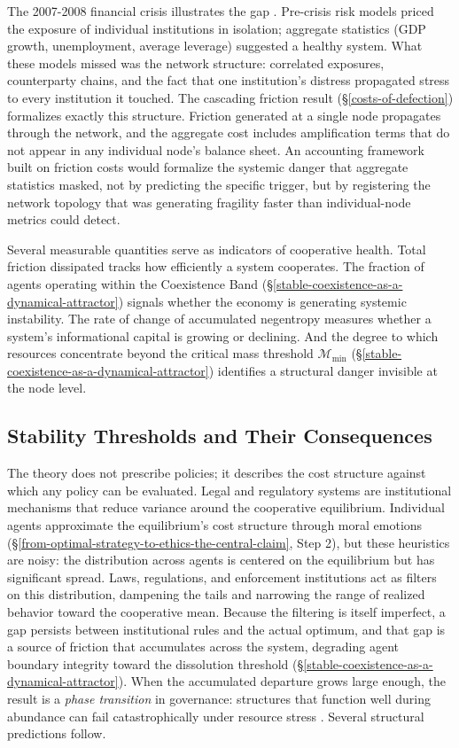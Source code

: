 \documentclass[11pt]{article}
\theoremstyle{plain}
\theoremstyle{definition}
\theoremstyle{remark}
\let\origsubsection\subsection
\renewcommand{\subsection}{\needspace{7\baselineskip}\origsubsection}
\begin{document}
The 2007-2008 financial crisis illustrates the gap \citep{Jackson2008}.
Pre-crisis risk models priced the exposure of individual institutions in
isolation; aggregate statistics (GDP growth, unemployment, average
leverage) suggested a healthy system. What these models missed was the
network structure: correlated exposures, counterparty chains, and the
fact that one institution's distress propagated stress to every
institution it touched. The cascading friction result
(§\ref{costs-of-defection}) formalizes exactly this structure. Friction
generated at a single node propagates through the network, and the
aggregate cost includes amplification terms that do not appear in any
individual node's balance sheet. An accounting framework built on
friction costs would formalize the systemic danger that aggregate
statistics masked, not by predicting the specific trigger, but by
registering the network topology that was generating fragility faster
than individual-node metrics could detect.

Several measurable quantities serve as indicators of cooperative health.
Total friction dissipated tracks how efficiently a system cooperates.
The fraction of agents operating within the Coexistence Band
(§\ref{stable-coexistence-as-a-dynamical-attractor}) signals whether the
economy is generating systemic instability. The rate of change of
accumulated negentropy measures whether a system's informational capital
is growing or declining. And the degree to which resources concentrate
beyond the critical mass threshold \(\mathcal{M}_{\min}\)
(§\ref{stable-coexistence-as-a-dynamical-attractor}) identifies a
structural danger invisible at the node level.

\subsection{Stability Thresholds and Their
Consequences}\label{stability-thresholds-and-their-consequences}

The theory does not prescribe policies; it describes the cost structure
against which any policy can be evaluated. Legal and regulatory systems
are institutional mechanisms that reduce variance around the cooperative
equilibrium. Individual agents approximate the equilibrium's cost
structure through moral emotions
(§\ref{from-optimal-strategy-to-ethics-the-central-claim}, Step 2), but
these heuristics are noisy: the distribution across agents is centered
on the equilibrium but has significant spread. Laws, regulations, and
enforcement institutions act as filters on this distribution, dampening
the tails and narrowing the range of realized behavior toward the
cooperative mean. Because the filtering is itself imperfect, a gap
persists between institutional rules and the actual optimum, and that
gap is a source of friction that accumulates across the system,
degrading agent boundary integrity toward the dissolution threshold
(§\ref{stable-coexistence-as-a-dynamical-attractor}). When the
accumulated departure grows large enough, the result is a \emph{phase
transition} in governance: structures that function well during
abundance can fail catastrophically under resource stress
\citep{Ostrom1990}. Several structural predictions follow.
\end{document}
